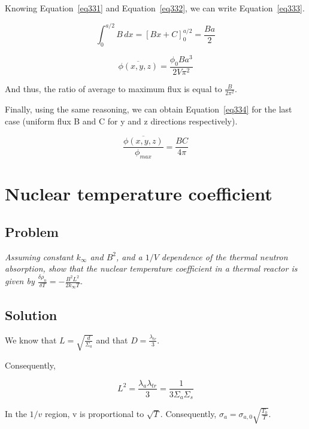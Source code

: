 Knowing Equation~\ref{eq331} and Equation~\ref{eq332}, we can write Equation~\ref{eq333}.

\begin{equation}\label{eq332}
\int_0^{a/2} B \,dx = \left[ Bx + C \right]_0^{a/2} = \frac{Ba}{2}
\end{equation}

\begin{equation}\label{eq333}
\overline{\phi(x,y,z)} = \frac{\phi_0 B a^3}{2 V\pi^2} 
\end{equation}

And thus, the ratio of average to maximum flux is equal to $\frac{B}{2 \pi^2}$.

Finally, using the same reasoning, we can obtain Equation~\ref{eq334} for the last case (uniform flux B and C for y and z directions respectively).

\begin{equation}\label{eq333}
\frac{\overline{\phi(x,y,z)}}{\phi_{max}} = \frac{B C}{4 \pi} 
\end{equation}

\section{Nuclear temperature coefficient}
\label{prob35}

\subsection{Problem}
\textit{Assuming constant $k_{\infty}$ and $B^2$, and a $1/V$ dependence of the thermal neutron absorption, show that the nuclear temperature coefficient in a thermal reactor is given by $\frac{\delta\rho_n}{\delta T} = - \frac{B^2 L^2}{2k_{\infty}T}$.}

\subsection{Solution}

We know that $L=\sqrt{\frac{d}{\Sigma_a}}$ and that $D = \frac{\lambda_{tr}}{3}$.

Consequently,

\begin{equation}\label{eq320}
L^2 = \frac{\lambda_a\lambda_{tr}}{3} = \frac{1}{3\Sigma_a\Sigma_s}
\end{equation}

In the $1/v$ region, v is proportional to $\sqrt{T}$. Consequently, $\sigma_a = \sigma_{a,0}\sqrt{\frac{T_0}{T}}$.

